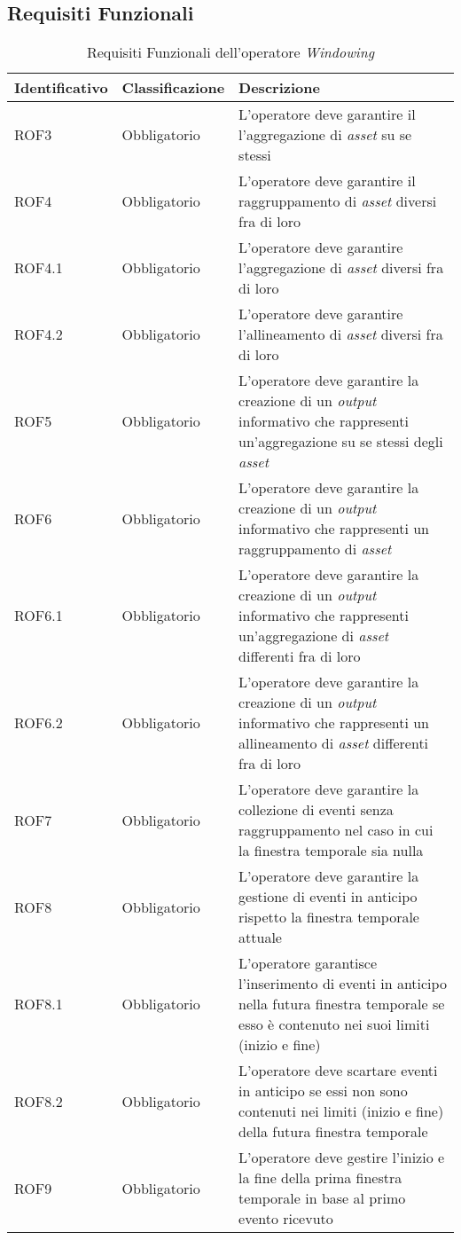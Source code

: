 \subsection{Requisiti Funzionali}
{
\centering
\begin{longtable}{L{3cm} L{3cm} L{7.5cm}}
\caption{Requisiti Funzionali dell'operatore \textit{Windowing}}\\
\textbf{Identificativo} &
\textbf{Classificazione}&
\textbf{Descrizione}\\
\endhead
\hline

ROF3 & Obbligatorio & L'operatore deve garantire il l'aggregazione di \textit{asset} su se stessi\\
\hline
ROF4 & Obbligatorio & L'operatore deve garantire il raggruppamento di \textit{asset} diversi fra di loro\\
\hline
ROF4.1 & Obbligatorio & L'operatore deve garantire l'aggregazione di \textit{asset} diversi fra di loro\\
\hline
ROF4.2 & Obbligatorio & L'operatore deve garantire l'allineamento di \textit{asset} diversi fra di loro\\
\hline
ROF5 & Obbligatorio & L'operatore deve garantire la creazione di un \textit{output} informativo che rappresenti un'aggregazione su se stessi degli \textit{asset}\\
\hline
ROF6 & Obbligatorio & L'operatore deve garantire la creazione di un \textit{output} informativo che rappresenti un raggruppamento di \textit{asset}\\
\hline
ROF6.1 & Obbligatorio & L'operatore deve garantire la creazione di un \textit{output} informativo che rappresenti un'aggregazione di \textit{asset} differenti fra di loro\\
\hline
ROF6.2 & Obbligatorio & L'operatore deve garantire la creazione di un \textit{output} informativo che rappresenti un allineamento di \textit{asset} differenti fra di loro\\
\hline
ROF7 & Obbligatorio & L'operatore deve garantire la collezione di eventi senza raggruppamento nel caso in cui la finestra temporale sia nulla\\
\hline
ROF8 & Obbligatorio & L'operatore deve garantire la gestione di eventi in anticipo rispetto la finestra temporale attuale\\
\hline
ROF8.1 & Obbligatorio & L'operatore garantisce l'inserimento di eventi in anticipo nella futura finestra temporale se esso è contenuto nei suoi limiti (inizio e fine)\\
\hline
ROF8.2 & Obbligatorio & L'operatore deve scartare eventi in anticipo se essi non sono contenuti nei limiti (inizio e fine) della futura finestra temporale\\
\hline
ROF9 & Obbligatorio & L'operatore deve gestire l'inizio e la fine della prima finestra temporale in base al primo evento ricevuto\\
\hline
\end{longtable}
}

